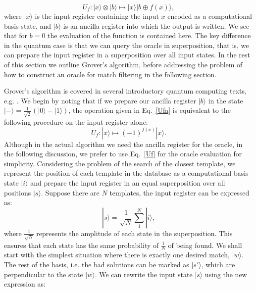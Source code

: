 \documentclass[aps,prd,nofootinbib,twocolumn,reprint,superscriptaddress,showpacs,showkeys,longbibliography]{revtex4-1}
\newcommand{\ket}[1]{|#1\rangle}
\begin{document}
\begin{equation}
    \label{Ufa}
    U_f: \ket{x}\otimes\ket{b}\longmapsto\ket{x}\ket{b \oplus f(x)},
\end{equation}
where $\ket{x}$ is the input register containing the input $x$ encoded as a computational basis state, and $\ket{b}$ is an ancilla register into which the output is written. We see that for $b=0$ the evaluation of the function is contained here. The key difference in the quantum case is that we can query the oracle in superposition, that is, we can prepare the input register in a superposition over all input states. In the rest of this section we outline Grover's algorithm, before addressing the problem of how to construct an oracle for match filtering in the following section.

Grover's algorithm is covered in several introductory quantum computing texts, e.g. \cite{barnett2009quantum, nielsen2002quantum,kaye2007introduction}. We begin by noting that if we prepare our ancilla register $\ket{b}$ in the state $\ket{-}=\frac{1}{\sqrt{2}}(\ket{0}-\ket{1})$, the operation given in Eq.~\ref{Ufa} is equivalent to the following procedure on the input register alone:
\begin{equation}
    \label{Uf}
    U_f: \ket{x}\longmapsto(-1)^{f(x)}\ket{x}.
\end{equation}
Although in the actual algorithm we need the ancilla register for the oracle, in the following discussion, we prefer to use Eq.~\ref{Uf} for the oracle evaluation for simplicity. 
\newline\newline Considering the problem of the search of the closest template, we represent the position of each template in the database as a computational basis state $\ket{i}$ and prepare the input register in an equal superposition over all positions $\ket{s}$. Suppose there are $N$ templates, the input register can be expressed as:
\begin{equation}
    \label{soo}
    \ket{s}=\frac{1}{\sqrt{N}}\sum^{N}_{1} \ket{i},
\end{equation}
where $\frac{1}{\sqrt{N}}$ represents the amplitude of each state in the superposition. This ensures that each state has the same probability of $\frac{1}{N}$ of being found. We shall start with the simplest situation where there is exactly one desired match, $\ket{w}$. The rest of the basis, i.e. the bad solutions can be marked as $\ket{s'}$, which are perpendicular to the state $\ket{w}$. We can rewrite the input state $\ket{s}$ using the new expression as:
\end{document}

